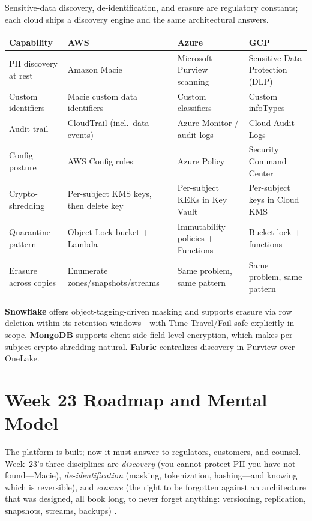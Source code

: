 \begin{crosscloud}
Sensitive-data discovery, de-identification, and erasure are regulatory constants; each cloud ships a discovery engine and the same architectural answers.

\vspace{2mm}
{\footnotesize
\begin{tabular}{@{}p{2.8cm}p{3.0cm}p{3.0cm}p{3.0cm}@{}}
\toprule
\textbf{Capability} & \textbf{AWS} & \textbf{Azure} & \textbf{GCP} \\
\midrule
PII discovery at rest & Amazon Macie & Microsoft Purview scanning & Sensitive Data Protection (DLP) \\
Custom identifiers & Macie custom data identifiers & Custom classifiers & Custom infoTypes \\
Audit trail & CloudTrail (incl.\ data events) & Azure Monitor / audit logs & Cloud Audit Logs \\
Config posture & AWS Config rules & Azure Policy & Security Command Center \\
Crypto-shredding & Per-subject KMS keys, then delete key & Per-subject KEKs in Key Vault & Per-subject keys in Cloud KMS \\
Quarantine pattern & Object Lock bucket + Lambda & Immutability policies + Functions & Bucket lock + functions \\
\addlinespace
Erasure across copies & Enumerate zones/snapshots/streams & Same problem, same pattern & Same problem, same pattern \\
\bottomrule
\end{tabular}}

\vspace{1mm}
\textbf{Snowflake} offers object-tagging-driven masking and supports erasure via row deletion within its retention windows---with Time Travel/Fail-safe explicitly in scope. \textbf{MongoDB} supports client-side field-level encryption, which makes per-subject crypto-shredding natural. \textbf{Fabric} centralizes discovery in Purview over OneLake.
\end{crosscloud}

\section{Week 23 Roadmap and Mental Model}
The platform is built; now it must answer to regulators, customers, and counsel. Week~23's three disciplines are \emph{discovery} (you cannot protect PII you have not found---Macie), \emph{de-identification} (masking, tokenization, hashing---and knowing which is reversible), and \emph{erasure} (the right to be forgotten against an architecture that was designed, all book long, to never forget anything: versioning, replication, snapshots, streams, backups) \cite{awsMacieDocs}.

